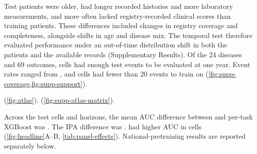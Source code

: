 Test patients were older, had longer recorded histories and more laboratory
measurements, and more often lacked registry-recorded clinical scores than
training patients. These differences included changes in registry coverage
and completeness, alongside shifts in age and disease mix. The temporal test
therefore evaluated performance under an out-of-time distribution shift in
both the patients and the available records (Supplementary Results). Of the 24 diseases and 69 outcomes,
 cells had enough test events to be evaluated at one year. Event rates ranged from , and  cells had fewer than 20 events to train on
(\cref{fig:supp-coverage,fig:supp-support}). 

\FloatBarrier
{}
 (\cref{fig:atlas}).
 (\cref{fig:supp-atlas-matrix}).



\FloatBarrier
{}
Across the test cells and horizons, the mean AUC difference between \opera{}
and per-task XGBoost was . The IPA difference was .
\opera{} had higher AUC in  cells
(\cref{fig:headline}A--B, \cref{tab:panel-effects}).
National-pretraining results are reported separately below.


